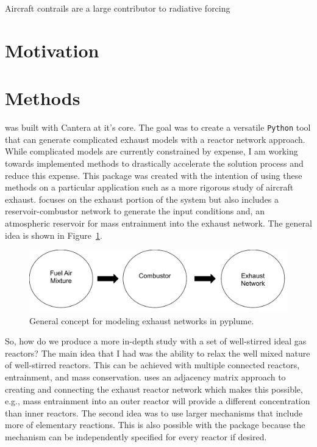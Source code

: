 \documentclass[smallextended,referee]{svjour3}
\begin{document}
Aircraft contrails are a large contributor to radiative forcing

\section{Motivation}


\section{Methods}

\pyplume{} was built with Cantera\cite{cantera} at it's core. The goal was to create a versatile \texttt{Python} tool that can generate complicated exhaust models with a reactor network approach. While complicated models are currently constrained by expense, I am working towards implemented methods to drastically accelerate the solution process and reduce this expense. This package was created with the intention of using these methods on a particular application such as a more rigorous study of aircraft exhaust. \pyplume{} focuses on the exhaust portion of the system but also includes a reservoir-combustor network to generate the input conditions and, an atmospheric reservoir for mass entrainment into the exhaust network. The general idea is shown in Figure~\ref{fig:general}.

\begin{figure}[htb!]
    \centering
    \includegraphics[scale=\SCALE]{examples/report/figs/general.pdf}
    \caption{General concept for modeling exhaust networks in pyplume.}
    \label{fig:general}
\end{figure}

So, how do we produce a more in-depth study with a set of well-stirred ideal gas reactors? The main idea that I had was the ability to relax the well mixed nature of well-stirred reactors. This can be achieved with multiple connected reactors, entrainment, and mass conservation. \pyplume{} uses an adjacency matrix approach to creating and connecting the exhaust reactor network which makes this possible, e.g., mass entrainment into an outer reactor will provide a different concentration than inner reactors. The second idea was to use larger mechanisms that include more of elementary reactions. This is also possible with the package because the mechanism can be independently specified for every reactor if desired. 
\end{document}
